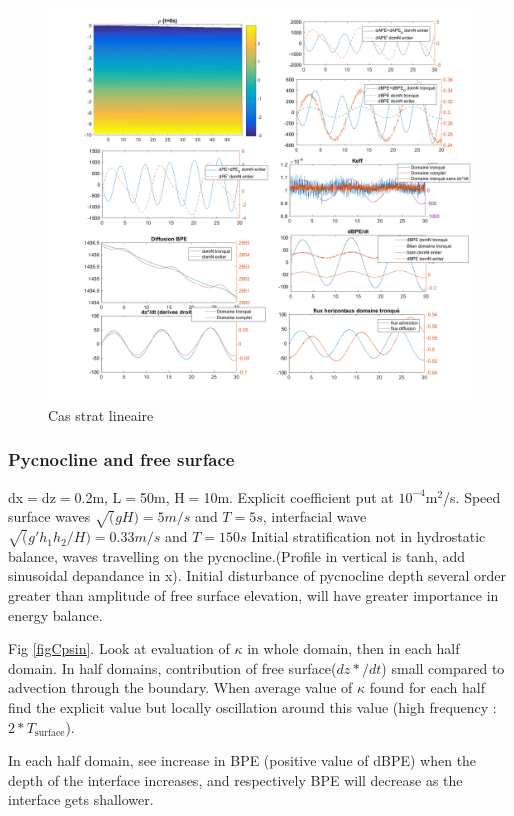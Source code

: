 \begin{figure}[h!]
\centering
\includegraphics[width=1\textwidth]{./CHAP_BPE/AGBPE_numlab6.png}
\caption{Cas strat lineaire}
\label{figClin}
\end{figure}

\subsubsection{Pycnocline and free surface}

dx$=$dz$=$0.2m, L$=$50m, H$=$10m. Explicit coefficient put at $10^{-4}$m$^2$/s. Speed surface waves $\sqrt(gH)=5m/s$ and $T=5s$, interfacial wave $\sqrt(g'h_1h_2/H)=0.33m/s$ and $T=150s$
Initial stratification not in hydrostatic balance, waves travelling on the pycnocline.(Profile in vertical is tanh, add sinusoidal depandance in x). Initial disturbance of pycnocline depth several order greater than amplitude of free surface elevation, will have greater importance in energy balance.

Fig \ref{figCpsin}. Look at evaluation of $\kappa$ in whole domain, then in each half domain. In half domains, contribution of free surface($dz*/dt$) small compared to advection through the boundary.  When average value of $\kappa$ found for each half find the explicit value but locally oscillation around this value (high frequency : $2*T_{\text{surface}}$).

In each half domain, see increase in BPE (positive value of dBPE) when the depth of the interface increases, and respectively BPE will decrease as the interface gets shallower.

